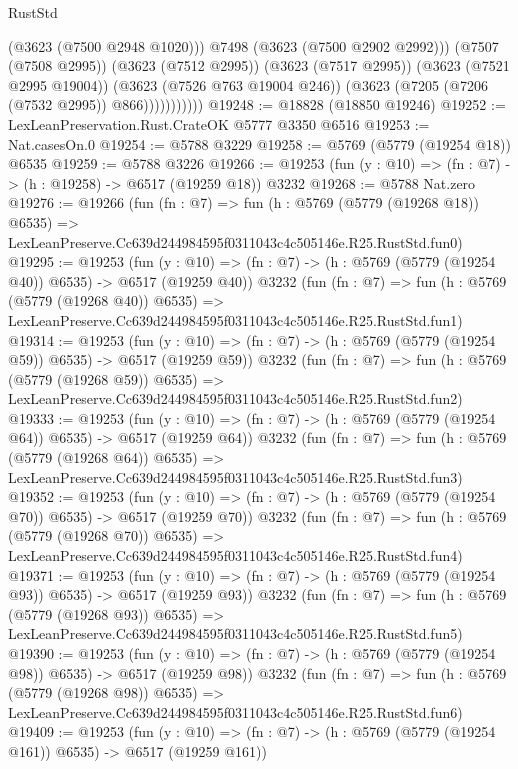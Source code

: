 \begin{lexlean}{RustStd}
\begin{coremodule}
                          (@3623 (@7500 @2948 @1020)))
                        @7498
                        (@3623 (@7500 @2902 @2992)))
                      (@7507 (@7508 @2995))
                      (@3623 (@7512 @2995))
                      (@3623 (@7517 @2995))
                      (@3623 (@7521 @2995 @19004))
                      (@3623 (@7526 @763 @19004 @246))
                      (@3623 (@7205 (@7206 (@7532 @2995)) @866)))))))))))
@19248 := @18828 (@18850 @19246)
@19252 := LexLeanPreservation.Rust.CrateOK @5777 @3350 @6516
@19253 := Nat.casesOn.{0}
@19254 := @5788 @3229
@19258 := @5769 (@5779 (@19254 @18)) @6535
@19259 := @5788 @3226
@19266 := @19253 (fun (y : @10) => (fn : @7) -> (h : @19258) -> @6517 (@19259 @18)) @3232
@19268 := @5788 Nat.zero
@19276 := @19266
    (fun (fn : @7) =>
    fun (h : @5769 (@5779 (@19268 @18)) @6535) =>
    LexLeanPreserve.Cc639d244984595f0311043c4c505146e.R25.RustStd.fun0)
@19295 := @19253
    (fun (y : @10) => (fn : @7) -> (h : @5769 (@5779 (@19254 @40)) @6535) -> @6517 (@19259 @40))
    @3232
    (fun (fn : @7) =>
    fun (h : @5769 (@5779 (@19268 @40)) @6535) =>
    LexLeanPreserve.Cc639d244984595f0311043c4c505146e.R25.RustStd.fun1)
@19314 := @19253
    (fun (y : @10) => (fn : @7) -> (h : @5769 (@5779 (@19254 @59)) @6535) -> @6517 (@19259 @59))
    @3232
    (fun (fn : @7) =>
    fun (h : @5769 (@5779 (@19268 @59)) @6535) =>
    LexLeanPreserve.Cc639d244984595f0311043c4c505146e.R25.RustStd.fun2)
@19333 := @19253
    (fun (y : @10) => (fn : @7) -> (h : @5769 (@5779 (@19254 @64)) @6535) -> @6517 (@19259 @64))
    @3232
    (fun (fn : @7) =>
    fun (h : @5769 (@5779 (@19268 @64)) @6535) =>
    LexLeanPreserve.Cc639d244984595f0311043c4c505146e.R25.RustStd.fun3)
@19352 := @19253
    (fun (y : @10) => (fn : @7) -> (h : @5769 (@5779 (@19254 @70)) @6535) -> @6517 (@19259 @70))
    @3232
    (fun (fn : @7) =>
    fun (h : @5769 (@5779 (@19268 @70)) @6535) =>
    LexLeanPreserve.Cc639d244984595f0311043c4c505146e.R25.RustStd.fun4)
@19371 := @19253
    (fun (y : @10) => (fn : @7) -> (h : @5769 (@5779 (@19254 @93)) @6535) -> @6517 (@19259 @93))
    @3232
    (fun (fn : @7) =>
    fun (h : @5769 (@5779 (@19268 @93)) @6535) =>
    LexLeanPreserve.Cc639d244984595f0311043c4c505146e.R25.RustStd.fun5)
@19390 := @19253
    (fun (y : @10) => (fn : @7) -> (h : @5769 (@5779 (@19254 @98)) @6535) -> @6517 (@19259 @98))
    @3232
    (fun (fn : @7) =>
    fun (h : @5769 (@5779 (@19268 @98)) @6535) =>
    LexLeanPreserve.Cc639d244984595f0311043c4c505146e.R25.RustStd.fun6)
@19409 := @19253
    (fun (y : @10) => (fn : @7) -> (h : @5769 (@5779 (@19254 @161)) @6535) -> @6517 (@19259 @161))

\end{coremodule}
\end{lexlean}
